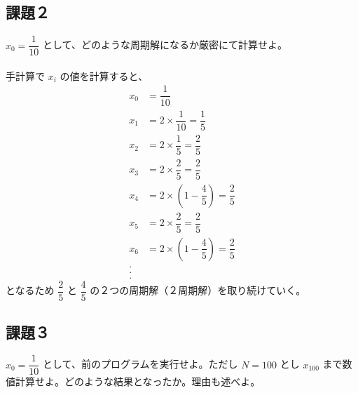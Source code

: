 \subsection{課題２}
$x_0 = \dfrac{1}{10}$ として、どのような周期解になるか厳密にて計算せよ。\\\\
手計算で $x_i$ の値を計算すると、
\begin{equation}
  \begin{split}
    x_0& = \dfrac{1}{10}\\
    x_1& = 2 \times \dfrac{1}{10} = \dfrac{1}{5}\\
    x_2& = 2 \times \dfrac{1}{5} = \dfrac{2}{5}\\
    x_3& = 2 \times \dfrac{2}{5} = \dfrac{2}{5}\\
    x_4& = 2 \times \left( 1 - \dfrac{4}{5} \right) = \dfrac{2}{5}\\
    x_5& = 2 \times \dfrac{2}{5} = \dfrac{2}{5}\\
    x_6& = 2 \times \left( 1 - \dfrac{4}{5} \right) = \dfrac{2}{5}\\
    .\\.\\.
  \end{split}
\end{equation}
となるため $\dfrac{2}{5}$ と $\dfrac{4}{5}$ の２つの周期解（２周期解）を取り続けていく。

\subsection{課題３}
$x_0 = \dfrac{1}{10}$ として、前のプログラムを実行せよ。ただし $N = 100$ とし $x_{100}$ まで数値計算せよ。どのような結果となったか。理由も述べよ。

